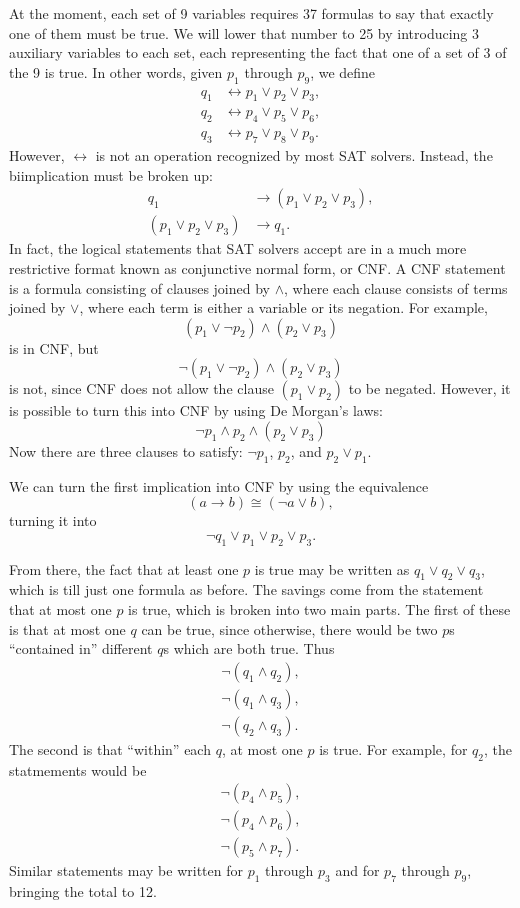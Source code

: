 \documentclass{article}
\begin{document}
At the moment, each set of 9 variables requires 37 formulas
to say that exactly one of them must be true.
We will lower that number to 25
by introducing 3 auxiliary variables to each set,
each representing the fact that
one of a set of 3 of the 9 is true.
In other words, given $p_1$ through $p_9$,
we define
\begin{align*}
  q_1 &\leftrightarrow p_1 \lor p_2 \lor p_3, \\
  q_2 &\leftrightarrow p_4 \lor p_5 \lor p_6, \\
  q_3 &\leftrightarrow p_7 \lor p_8 \lor p_9.
\end{align*}
However, $\leftrightarrow$ is not an operation recognized by most SAT solvers.
Instead, the biimplication must be broken up:
\begin{align*}
  q_1 &\rightarrow (p_1 \lor p_2 \lor p_3), \\
  (p_1 \lor p_2 \lor p_3) &\rightarrow q_1.
\end{align*}
In fact, the logical statements that SAT solvers accept
are in a much more restrictive format known as
conjunctive normal form, or CNF.
A CNF statement is a formula consisting of clauses joined by $\land$,
where each clause consists of terms joined by $\lor$,
where each term is either a variable or its negation.
For example,
\[(p_1 \lor \lnot p_2) \land (p_2 \lor p_3)\]
is in CNF, but
\[\lnot (p_1 \lor \lnot p_2) \land (p_2 \lor p_3)\]
is not, since CNF does not allow the clause
$(p_1 \lor p_2)$ to be negated.
However, it is possible to turn this into CNF by using De Morgan's laws:
\[\lnot p_1 \land p_2 \land (p_2 \lor p_3)\]
Now there are three clauses to satisfy:
$\lnot p_1$, $p_2$, and $p_2 \lor p_1$.

We can turn the first implication into CNF
by using the equivalence
\[(a \rightarrow b) \cong (\lnot a \lor b),\]
turning it into
\[\lnot q_1 \lor p_1 \lor p_2 \lor p_3.\]

From there, the fact that at least one $p$ is true
may be written as $q_1 \lor q_2 \lor q_3$,
which is till just one formula as before.
The savings come from the statement that
at most one $p$ is true,
which is broken into two main parts.
The first of these is that
at most one $q$ can be true,
since otherwise,
there would be two $p$s ``contained in'' different $q$s which are both true.
Thus
\begin{align*}
  \lnot (q_1 \land q_2), \\
  \lnot (q_1 \land q_3), \\
  \lnot (q_2 \land q_3).
\end{align*}
The second is that ``within'' each $q$,
at most one $p$ is true.
For example, for $q_2$, the statmements would be
\begin{align*}
  \lnot (p_4 \land p_5), \\
  \lnot (p_4 \land p_6), \\
  \lnot (p_5 \land p_7).
\end{align*}
Similar statements may be written for $p_1$ through $p_3$
and for $p_7$ through $p_9$,
bringing the total to 12.
\end{document}
